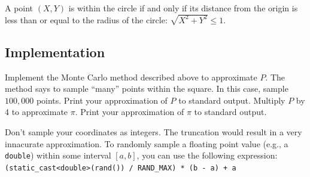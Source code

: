 \documentclass{article}
\newenvironment{hint}
    {\begin{tcolorbox}[title=Hint,colframe=white!70!blue,colback=white]}
    {\end{tcolorbox}}
\begin{document}
A point $(X, Y)$ is within the circle if and only if its distance from the origin is less than or equal to the radius of the circle: $\sqrt{X^2 + Y^2} \leq 1$.

\subsection{Implementation}

Implement the Monte Carlo method described above to approximate $P$. The method says to sample ``many'' points within the square. In this case, sample $100{,}000$ points. Print your approximation of $P$ to standard output. Multiply $P$ by 4 to approximate $\pi$. Print your approximation of $\pi$ to standard output.

\begin{hint}
    Don't sample your coordinates as integers. The truncation would result in a very innacurate approximation. To randomly sample a floating point value (e.g., a \texttt{double}) within some interval $[a, b]$, you can use the following expression: \texttt{(static\_cast<double>(rand()) / RAND\_MAX) * (b - a) + a}
\end{hint}
\end{document}
